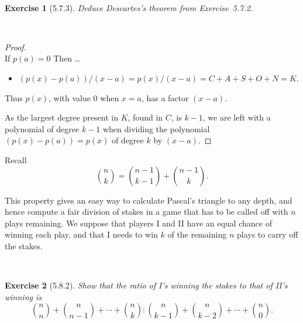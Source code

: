 \documentclass[12pt]{article}
\newcommand{\XB}{\color{black}}
\newcommand{\XBB}{\color{blue}}
\newcommand{\ds}{\displaystyle}
\theoremstyle{plain}
\newtheorem{ex}{Exercise}
\begin{document}
\newpage

\XBB\hrulefill\XB \\
\begin{ex} [5.7.3]
  Deduce Descartes's theorem from Exercise~5.7.2.
\end{ex}
\XBB\hrulefill\XB \\

\begin{proof}
  \ \\

  If $ p(a) = 0 $ Then \dots

  \begin{itemize}
    \item $ \ds (p(x) - p(a)) / (x - a) = p(x) / (x - a) = C + A + S + O + N = K $.
  \end{itemize}

  Thus $ p(x) $, with value $ 0 $ when $ x = a $, has a factor $ (x - a) $.

  As the largest degree present in $ K $, found in $ C $, is $ k - 1 $,
  we are left with a polynomial of degree $ k - 1 $ when dividing the polynomial $ (p(x) - p(a)) = p(x) $ of degree $ k $ by $ (x - a) $.
\end{proof}

\newpage

Recall
\[
  \binom{n}{k} = \binom{n - 1}{k - 1} + \binom{n - 1}{k}.
\]

This property gives an easy way to calculate Pascal's triangle to any depth,
and hence compute a fair division of stakes in a game that has to be called off with $ n $ plays remaining.
We suppose that players I and II have an equal chance of winning each play,
and that I needs to win $ k $ of the remaining $ n $ plays to carry off the stakes.


\XBB\hrulefill\XB \\
\begin{ex} [5.8.2]
  Show that the ratio of I's winning the stakes to that of II's winning is
  \[
    \binom{n}{n} + \binom{n}{n - 1} + \cdots + \binom{n}{k} : \binom{n}{k - 1} + \binom{n}{k - 2} + \cdots + \binom{n}{0}.
  \]
\end{ex}
\XBB\hrulefill\XB \\
\end{document}
